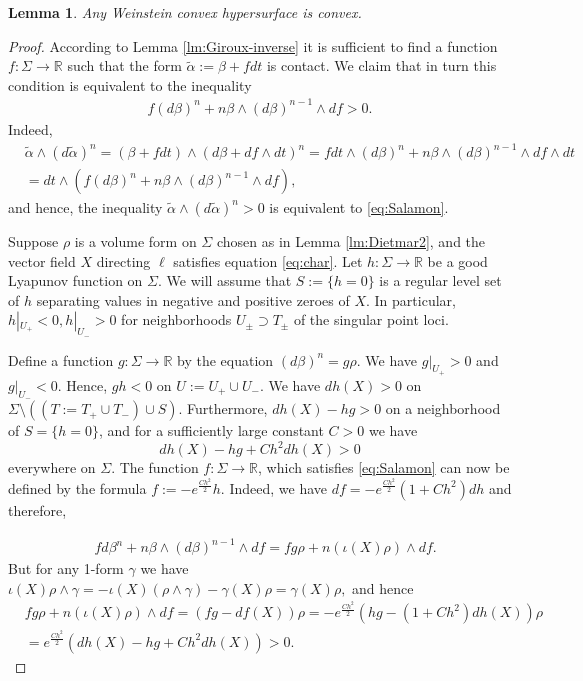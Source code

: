 \documentclass[12pt]{amsart}
\theoremstyle{plain}
\newtheorem{lemma}[theorem]{Lemma}
\theoremstyle{definition}
\theoremstyle{remark}
\newcommand{\R}{\mathbb{R}}
\newcommand{\wt}{\widetilde}
\begin{document}
 \medskip
  
 
 
  \begin{lemma}\label{lm:W-convex} Any Weinstein convex hypersurface is convex.
  \end{lemma} 
   \begin{proof} 
   According to Lemma \ref{lm:Giroux-inverse} it is sufficient to find a function $f:\Sigma\to\R$ such that
   the form $\wt\alpha:=\beta+fdt$ is contact.
 We claim that in turn  this   condition is equivalent to the inequality
  \begin{align}\label{eq:Salamon}
  f(d\beta)^n+n\beta\wedge (d\beta)^{n-1}\wedge df>0.
 \end{align}
Indeed,
\begin{align*}
&\wt\alpha\wedge (d\wt\alpha)^n=(\beta+fdt)\wedge
(d\beta+df\wedge dt)^n=fdt\wedge(d\beta)^n+ n\beta\wedge (d\beta)^{n-1}\wedge df\wedge dt\\
&=
dt\wedge\left( f(d\beta)^n+n\beta\wedge (d\beta)^{n-1}\wedge df\right),
\end{align*}
and hence, the inequality $ \wt\alpha\wedge (d\wt\alpha)^n >0$ is equivalent to \eqref{eq:Salamon}.
  
   Suppose $\rho$ is a volume form on $\Sigma$ chosen as in Lemma \ref{lm:Dietmar2}, and the vector field $X$ directing $\ell$ satisfies equation
   \eqref{eq:char}.  Let $h:\Sigma\to\R$ be a good Lyapunov function on $\Sigma$.
   We will assume that $S:=\{h=0\}$ is a regular level set of $h$ separating  values in negative and positive zeroes of $X$. In particular, $h|_{U_+}<0, h|_{U_-}>0$ for neighborhoods $U_{\pm}\supset T_\pm$ of the singular point loci.
   
   Define a function $g:\Sigma\to\R$ by the equation
   $ (d\beta)^n=g\rho$. 
   We have $g|_{U_+}>0$ and $g|_{U_-}<0$. Hence, $gh<0$ on $U:=U_+\cup U_-$. We have $dh(X)>0$  on $ \Sigma\setminus ((T:=T_+\cup T_-)\cup S)$. Furthermore,   
   $dh(X)-hg>0$  on     a neighborhood  of  $S=\{h=0\}$, and   for a sufficiently large constant $C>0$ we have $$dh(X)-hg+Ch^2dh(X)>0$$ everywhere on $\Sigma$. 
   The 
 function $f:\Sigma\to\R$,  which satisfies \eqref{eq:Salamon}  can now be defined by the formula $f:=-e^{\frac{Ch^2}2}h.$ 
   Indeed,   we have $df=-e^{\frac{Ch^2}2}(1+Ch^2)dh$ and therefore,
   
   \begin{align*}
   &fd\beta^n+n\beta\wedge (d\beta)^{n-1}\wedge df=fg\rho+n(\iota(X)\rho)\wedge df.
   \end{align*}
   But for any 1-form $\gamma$ we have  $\iota(X)\rho\wedge\gamma=-\iota(X)(\rho\wedge\gamma)-\gamma(X)\rho=\gamma(X)\rho,$ and hence
      \begin{align*} 
& fg\rho+n(\iota(X)\rho)\wedge df=(fg-df(X))\rho=-e^{\frac{Ch^2}2}\left(hg-(1+Ch^2)dh(X)\right)\rho\\
&=e^{\frac{Ch^2}2}(dh(X)-hg+Ch^2dh(X))>0.
\end{align*}
  \end{proof}
\end{document}
